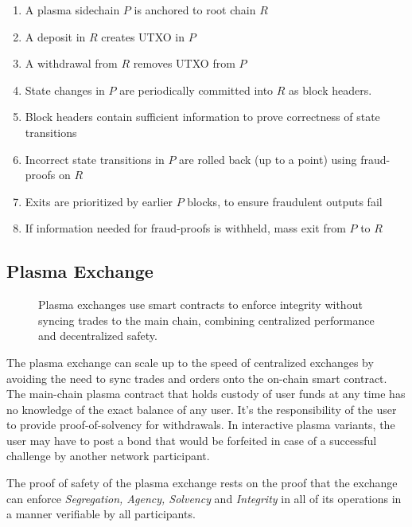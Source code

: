 \documentclass[12pt,a4paper]{article}
\begin{document}
\begin{enumerate}
    \item A plasma sidechain $P$ is anchored to root chain $R$
    \item A deposit in $R$ creates UTXO in $P$
    \item A withdrawal from $R$ removes UTXO from $P$
    \item State changes in $P$ are periodically committed into $R$ as block headers.
    \item Block headers contain sufficient information to prove correctness of state transitions
    \item Incorrect state transitions in $P$ are rolled back (up to a point) using fraud-proofs on $R$
    \item Exits are prioritized by earlier $P$ blocks, to ensure fraudulent outputs fail
    \item If information needed for fraud-proofs is withheld, mass exit from $P$ to $R$
\end{enumerate}

\subsection{Plasma Exchange}
\begin{figure}[ht]
\begin{center}

\end{center}
\caption{Plasma exchanges use smart contracts to enforce integrity without syncing trades to the main chain, combining centralized performance and decentralized safety. }
\end{figure}

The plasma exchange can scale up to the speed of centralized exchanges by avoiding the need to sync trades and orders onto the on-chain smart contract. The main-chain plasma contract that holds custody of user funds at any time has no knowledge of the exact balance of any user. It’s the responsibility of the user to provide proof-of-solvency for withdrawals. In interactive plasma variants, the user may have to post a bond that would be forfeited in case of a successful challenge by another network participant.

The proof of safety of the plasma exchange rests on the proof that the exchange can enforce \emph{Segregation, Agency, Solvency} and \emph{Integrity} in all of its operations in a manner verifiable by all participants. 
\end{document}
